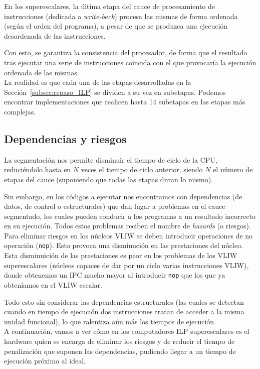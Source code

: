 En los superescalares, la última etapa del cauce de procesamiento de instrucciones (dedicada a \emph{write-back}) procesa las mismas de forma ordenada (según el orden del programa), a pesar de que se produzca una ejecución desordenada de las instrucciones.

Con esto, se garantiza la consistencia del procesador, de forma que el resultado tras ejecutar una serie de instrucciones coincida con el que provocaría la ejecución ordenada de las mismas.\\

La realidad es que cada una de las etapas desarrolladas en la Sección~\ref{subsec:repaso_ILP} se dividen a su vez en subetapas. Podemos encontrar implementaciones que realicen hasta 14 subetapas en las etapas más complejas.

\subsection{Dependencias y riesgos}
La segmentación nos permite disminuir el tiempo de ciclo de la CPU, reduciéndolo hasta en $N$ veces el tiempo de ciclo anterior, siendo $N$ el número de etapas del cauce (suponiendo que todas las etapas duran lo mismo).

Sin embargo, en los códigos a ejecutar nos encontramos con dependencias (de datos, de control o estructurales) que dan lugar a problemas en el cauce segmentado, los cuales pueden conducir a los programas a un resultado incorrecto en su ejecución. Todos estos problemas reciben el nombre de \emph{hazards} (o riesgos).\\

Para eliminar riesgos en los núcleos VLIW se deben introducir operaciones de no operación (\verb|nop|). Esto provoca una disminución en las prestaciones del núcleo. Esta disminuición de las prestaciones es peor en los problemas de los VLIW superescalares (núcleos capaces de dar por un ciclo varias instrucciones VLIW), donde obtenemos un IPC mucho mayor al introducir \verb|nop| que los que ya obteníamos en el VLIW escalar.

Todo esto sin considerar las dependencias estructurales (las cuales se detectan cuando en tiempo de ejecución dos instrucciones tratan de acceder a la misma unidad funcional), lo que ralentiza aún más los tiempos de ejecución.\\

A continuación, vamos a ver cómo en los computadores ILP superescalares es el hardware quien se encarga de eliminar los riesgos y de reducir el tiempo de penalización que suponen las dependencias, pudiendo llegar a un tiempo de ejecución próximo al ideal.

